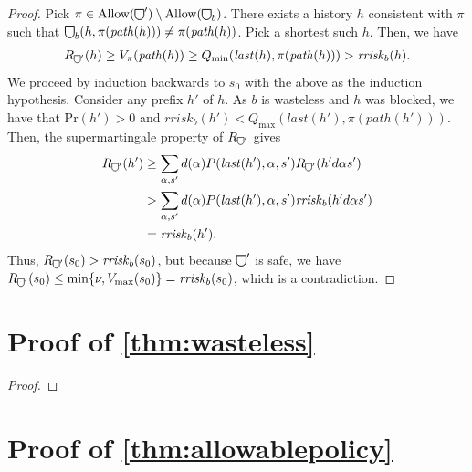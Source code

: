\documentclass[runningheads]{llncs}
\newcommand{\Allow}{\mathrm{Allow}}
\newcommand\shieldbase{%
  \tikz[baseline=0.2ex] \draw[semithick]
    (0,1.75ex) -- (0,0.75ex)
    arc [radius=0.75ex, start angle=-180, end angle=0]
    -- (1.5ex,1.75ex) -- cycle;%
}
\DeclareRobustCommand\shield{%
  \mathord{\scalerel*{\shieldbase}{\bigcirc}}%
}
\renewcommand{\Pr}{\mathrm{Pr}}
\newcommand{\rrisk}{\mathit{rrisk}}
\newcommand{\hpath}{\mathit{path}}
\newcommand{\last}{\mathit{last}}
\newcommand{\customcomment}[2]{\marginpar{\textcolor{#1}{\scriptsize{#2}}}}
\newcommand{\lh}[1]{\customcomment{orange}{LH: #1}}
\begin{document}
\begin{proof}
    Pick \(\pi \in \Allow(\shield') \setminus \Allow(\shield_b)\).
    There exists a history \(h\) consistent with \(\pi\) such that \(\shield_{b}(h,\pi(\hpath(h))) \neq \pi(\hpath(h))\). Pick a shortest such \(h\).
    Then, we have
    \begin{align*}
        R_{\shield'}(h) \geq V_{\pi}(\hpath(h)) \geq Q_{\min}(\last(h), \pi(\hpath(h))) > \rrisk_b(h).
    \end{align*}
    We proceed by induction backwards to \(s_0\) with the above as the induction hypothesis. Consider any prefix \(h'\) of \(h\).
    As \(b\) is wasteless and \(h\) was blocked, we have that \(\Pr(h') > 0\) and \(\rrisk_b(h') < Q_{\max}(\last(h'), \pi(\hpath(h')))\).
    Then, the supermartingale property of \(R_{\shield'}\) gives
    \begin{align*}
        R_{\shield'}(h') &\geq \sum_{\alpha, s'} d(\alpha) P(\last(h'), \alpha, s') R_{\shield'}(h' d \alpha s') \\
        &> \sum_{\alpha, s'} d(\alpha) P(\last(h'), \alpha, s') \rrisk_b(h' d \alpha s') \\
        &= \rrisk_b(h').
    \end{align*}
    Thus, \(R_{\shield'}(s_0) > \rrisk_b(s_0)\), but because \(\shield'\) is safe, we have \(R_{\shield'}(s_0) \leq \min \{\nu, V_{\max}(s_0)\} = \rrisk_b(s_0)\), which is a contradiction.
\end{proof}

\section{Proof of \cref{thm:wasteless}}

\begin{proof}
\end{proof}


\section{Proof of \cref{thm:allowablepolicy}}

\lh{TODO}


\endgroup
\fi
\end{document}
